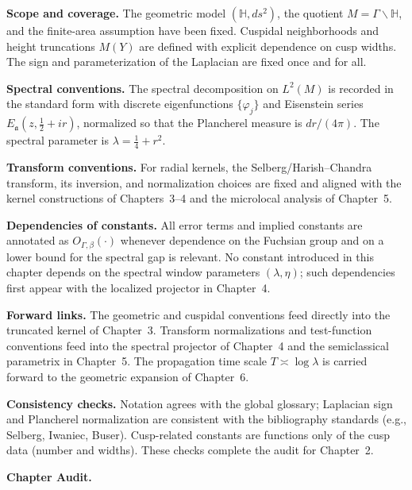 \noindent\textbf{Scope and coverage.}
The geometric model $(\mathbb{H},ds^2)$, the quotient $M=\Gamma\backslash\mathbb{H}$,
and the finite-area assumption have been fixed. Cuspidal neighborhoods and
height truncations $M(Y)$ are defined with explicit dependence on cusp widths.
The sign and parameterization of the Laplacian are fixed once and for all.

\medskip
\noindent\textbf{Spectral conventions.}
The spectral decomposition on $L^2(M)$ is recorded in the standard form with
discrete eigenfunctions $\{\varphi_j\}$ and Eisenstein series
$E_{\mathfrak a}(z,\tfrac12+ir)$, normalized so that the Plancherel measure
is $dr/(4\pi)$. The spectral parameter is $\lambda=\frac14+r^2$.

\medskip
\noindent\textbf{Transform conventions.}
For radial kernels, the Selberg/Harish–Chandra transform, its inversion, and
normalization choices are fixed and aligned with the kernel constructions of
Chapters~3–4 and the microlocal analysis of Chapter~5.

\medskip
\noindent\textbf{Dependencies of constants.}
All error terms and implied constants are annotated as $O_{\Gamma,\beta}(\cdot)$
whenever dependence on the Fuchsian group and on a lower bound for the spectral
gap is relevant. No constant introduced in this chapter depends on the spectral
window parameters $(\lambda,\eta)$; such dependencies first appear with the
localized projector in Chapter~4.

\medskip
\noindent\textbf{Forward links.}
The geometric and cuspidal conventions feed directly into the truncated kernel
of Chapter~3. Transform normalizations and test-function conventions feed into
the spectral projector of Chapter~4 and the semiclassical parametrix in
Chapter~5. The propagation time scale $T\asymp\log\lambda$ is carried forward
to the geometric expansion of Chapter~6.

\medskip
\noindent\textbf{Consistency checks.}
Notation agrees with the global glossary; Laplacian sign and Plancherel
normalization are consistent with the bibliography standards (e.g., Selberg,
Iwaniec, Buser). Cusp-related constants are functions only of the cusp data
(number and widths). These checks complete the audit for Chapter~2.


\medskip
\noindent\textbf{Chapter Audit.}

